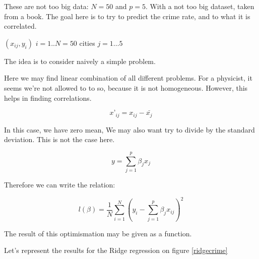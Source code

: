 \documentclass[a4paper]{tufte-book}
\begin{document}
These are not too big data: $N=50$ and $p=5$.
With a not too big dataset, taken from a book. The goal here is to try to
predict the crime rate, and to what it is correlated.

$(x_{ij}, y_i)$ $i=1..N=50$ cities
$j=1…5$

The idea is to consider naively a simple problem.

Here we may find linear combination of all different problems.
For a physicist, it seems we’re not allowed to to so, because it is not
homogeneous. However, this helps in finding correlations.

\begin{equation}
    x’_{ij} = x_{ij} - \bar{x_j}
\end{equation}

In this case, we have zero mean, We may also want try to divide by the standard
deviation. This is not the case here.

\begin{equation}
    y=\sum_{j=1}^p \beta_j x_j
\end{equation}

Therefore we can write the relation:

\begin{equation}
    l(\beta) = \frac{1}{N} \sum_{i=1}^N (y_i - \sum_{j=1}^p \beta_j x_{ij})^2
\end{equation}

The result of this optimismation may be given as a function.

Let's represent the results for the Ridge regression on figure \ref{ridgecrime}
\end{document}
